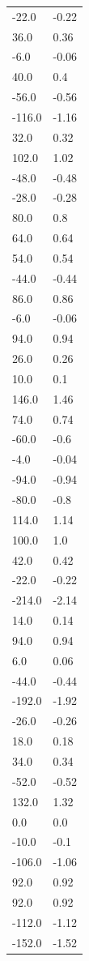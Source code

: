\begin{longtable}{ll}
-22.0 & -0.22 \\
36.0 & 0.36 \\
-6.0 & -0.06 \\
40.0 & 0.4 \\
-56.0 & -0.56 \\
-116.0 & -1.16 \\
32.0 & 0.32 \\
102.0 & 1.02 \\
-48.0 & -0.48 \\
-28.0 & -0.28 \\
80.0 & 0.8 \\
64.0 & 0.64 \\
54.0 & 0.54 \\
-44.0 & -0.44 \\
86.0 & 0.86 \\
-6.0 & -0.06 \\
94.0 & 0.94 \\
26.0 & 0.26 \\
10.0 & 0.1 \\
146.0 & 1.46 \\
74.0 & 0.74 \\
-60.0 & -0.6 \\
-4.0 & -0.04 \\
-94.0 & -0.94 \\
-80.0 & -0.8 \\
114.0 & 1.14 \\
100.0 & 1.0 \\
42.0 & 0.42 \\
-22.0 & -0.22 \\
-214.0 & -2.14 \\
14.0 & 0.14 \\
94.0 & 0.94 \\
6.0 & 0.06 \\
-44.0 & -0.44 \\
-192.0 & -1.92 \\
-26.0 & -0.26 \\
18.0 & 0.18 \\
34.0 & 0.34 \\
-52.0 & -0.52 \\
132.0 & 1.32 \\
0.0 & 0.0 \\
-10.0 & -0.1 \\
-106.0 & -1.06 \\
92.0 & 0.92 \\
92.0 & 0.92 \\
-112.0 & -1.12 \\
-152.0 & -1.52 \\

\end{longtable}
